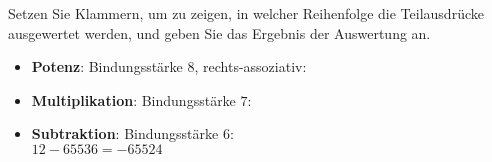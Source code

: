 \begin{frame}
    \begin{exercise}
        Setzen Sie Klammern, um zu zeigen, in welcher Reihenfolge die Teilausdrücke ausgewertet werden, und geben Sie das Ergebnis der Auswertung an.
    \end{exercise}
    \begin{solve}
    \begin{itemize}
        \item \textbf{Potenz}: Bindungsstärke $8$, rechts-assoziativ:\hfill{}
        \item \textbf{Multiplikation}: Bindungsstärke $7$:\hfill{}
        \item \textbf{Subtraktion}: Bindungsstärke $6$:\hfill{}\\
        \hfill$12 - 65536 = -65524$
    \end{itemize}
    \end{solve}
\end{frame}